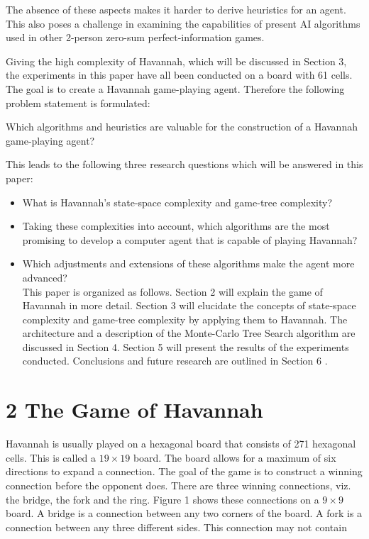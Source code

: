 \documentclass[10pt]{article}
\begin{document}
The absence of these aspects makes it harder to derive heuristics for an agent. This also poses a challenge in examining the capabilities of present AI algorithms used in other 2-person zero-sum perfect-information games.

Giving the high complexity of Havannah, which will be discussed in Section 3, the experiments in this paper have all been conducted on a board with 61 cells. The goal is to create a Havannah game-playing agent. Therefore the following problem statement is formulated:

Which algorithms and heuristics are valuable for the construction of a Havannah game-playing agent?

This leads to the following three research questions which will be answered in this paper:

\begin{itemize}
  \item What is Havannah's state-space complexity and game-tree complexity?
  \item Taking these complexities into account, which algorithms are the most promising to develop a computer agent that is capable of playing Havannah?
  \item Which adjustments and extensions of these algorithms make the agent more advanced?\\
This paper is organized as follows. Section 2 will explain the game of Havannah in more detail. Section 3 will elucidate the concepts of state-space complexity and game-tree complexity by applying them to Havannah. The architecture and a description of the Monte-Carlo Tree Search algorithm are discussed in Section 4. Section 5 will present the results of the experiments conducted. Conclusions and future research are outlined in Section 6 .
\end{itemize}

\section*{2 The Game of Havannah}
Havannah is usually played on a hexagonal board that consists of 271 hexagonal cells. This is called a $19 \times 19$ board. The board allows for a maximum of six directions to expand a connection. The goal of the game is to construct a winning connection before the opponent does. There are three winning connections, viz. the bridge, the fork and the ring. Figure 1 shows these connections on a $9 \times 9$ board. A bridge is a connection between any two corners of the board. A fork is a connection between any three different sides. This connection may not contain
\end{document}

